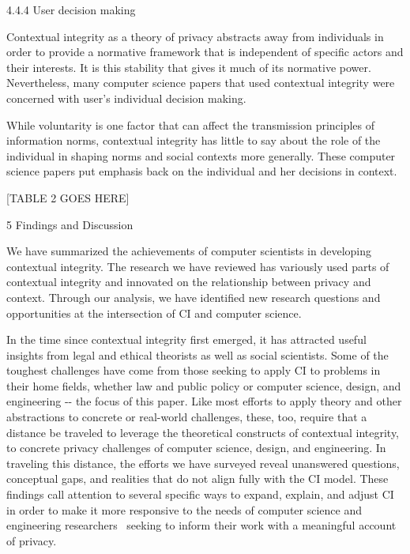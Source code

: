 \documentclass[../thesis.tex]{subfiles}
\begin{document}
{\color[rgb]{0.4,0.4,0.4}
4.4.4 User decision making}


\bigskip

Contextual integrity as a theory of privacy abstracts away from
individuals in order to provide a normative framework that is
independent of specific actors and their interests. It is this
stability that gives it much of its normative power. Nevertheless, many
computer science papers that used contextual integrity were concerned
with user's individual decision making.


\bigskip

While voluntarity is one factor that can affect the transmission
principles of information norms, contextual integrity has little to say
about the role of the individual in shaping norms and social contexts
more generally. These computer science papers put emphasis back on the
individual and her decisions in context.


\bigskip

[TABLE 2 GOES HERE]

5 Findings and Discussion

\textcolor[rgb]{0.2,0.2,0.2}{We have summarized the achievements of
computer scientists in developing contextual integrity. The research we
have reviewed has variously used parts of contextual integrity and
innovated on the relationship between privacy and context. Through our
analysis, we have identified new research questions and opportunities
at the intersection of CI and computer science.}

\textcolor[rgb]{0.2,0.2,0.2}{In the time since contextual integrity
first emerged, it has attracted useful insights from legal and ethical
theorists as well as social scientists. Some of the toughest challenges
have come from those seeking to apply CI to problems in their home
fields, whether law and public policy or computer science, design, and
engineering -{}- the focus of this paper. Like most efforts to apply
theory and other abstractions to concrete or real-world challenges,
these, too, require that a distance be traveled to leverage the
theoretical constructs of contextual integrity, to concrete privacy
challenges of computer science, design, and engineering. In traveling
this distance, the efforts we have surveyed reveal unanswered
questions, conceptual gaps, and realities that do not align fully with
the CI model. These findings call attention to several specific ways to
expand, explain, and adjust CI in order to make it more responsive to
the needs of computer science and engineering researchers \ seeking to
inform their work with a meaningful account of privacy. }
\end{document}
